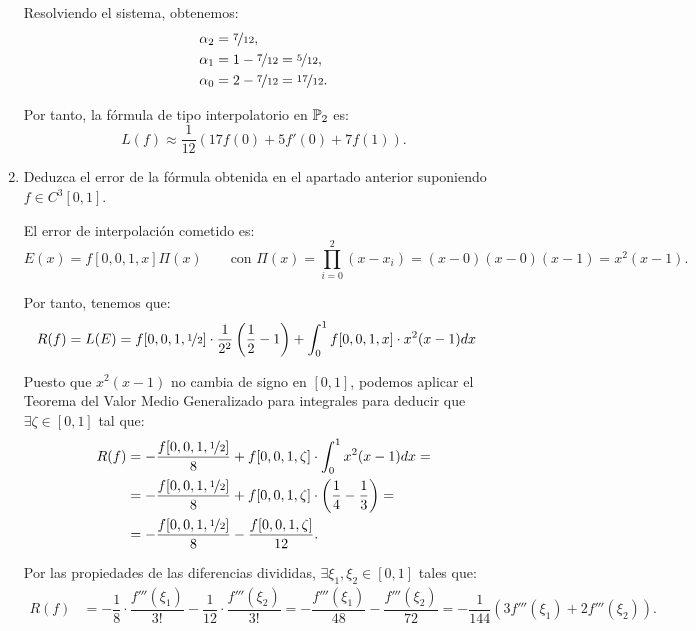 \begin{ejercicio}
\begin{enumerate}
        Resolviendo el sistema, obtenemos:
        \begin{align*}
            \alpha_2 &= \nicefrac{7}{12},\\
            \alpha_1 &= 1 - \nicefrac{7}{12} = \nicefrac{5}{12},\\
            \alpha_0 &= 2 - \nicefrac{7}{12} = \nicefrac{17}{12}.
        \end{align*}

        Por tanto, la fórmula de tipo interpolatorio en $\mathbb{P}_2$ es:
        \begin{equation*}
            L(f) \approx \dfrac{1}{12}\left(17f(0) + 5f'(0) + 7f(1)\right).
        \end{equation*}
        
        \item Deduzca el error de la fórmula obtenida en el apartado anterior suponiendo $f \in C^3[0, 1]$.
        
        El error de interpolación cometido es:
        \begin{equation*}
            E(x) = f[0,0,1,x]\Pi(x)\qquad \text{con } \Pi(x) = \prod_{i=0}^{2} (x - x_i) = (x - 0)(x - 0)(x - 1) = x^2(x - 1).
        \end{equation*}

        Por tanto, tenemos que:
        \begin{align*}
            R(f) &= L(E) = f[0,0,1,\nicefrac{1}{2}]\cdot \dfrac{1}{2^2}\left(\frac{1}{2}-1\right) + \int_{0}^{1} f[0,0,1,x]\cdot x^2(x - 1) dx
        \end{align*}

        Puesto que $x^2(x - 1)$ no cambia de signo en $[0, 1]$, podemos aplicar el Teorema del Valor Medio Generalizado para integrales para deducir que $\exists \zeta \in [0, 1]$ tal que:
        \begin{align*}
            R(f) &= -\dfrac{f[0,0,1,\nicefrac{1}{2}]}{8} + f[0,0,1,\zeta]\cdot \int_{0}^{1} x^2(x - 1) dx
            =\\&= -\dfrac{f[0,0,1,\nicefrac{1}{2}]}{8} + f[0,0,1,\zeta]\cdot \left( \dfrac{1}{4} - \dfrac{1}{3} \right)
            =\\&= -\dfrac{f[0,0,1,\nicefrac{1}{2}]}{8} - \dfrac{f[0,0,1,\zeta]}{12}.
        \end{align*}

        Por las propiedades de las diferencias divididas, $\exists \xi_1, \xi_2 \in [0, 1]$ tales que:
        \begin{align*}
            R(f) &= -\dfrac{1}{8}\cdot \dfrac{f'''(\xi_1)}{3!} - \dfrac{1}{12}\cdot \dfrac{f'''(\xi_2)}{3!}
            = -\dfrac{f'''(\xi_1)}{48} - \dfrac{f'''(\xi_2)}{72}
            = -\dfrac{1}{144}\left(3f'''(\xi_1) + 2f'''(\xi_2)\right).
        \end{align*}


\end{enumerate}
\end{ejercicio}
